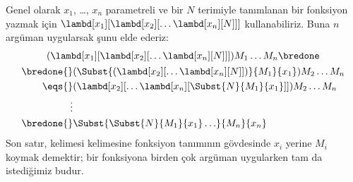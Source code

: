 \documentclass[../../../include/open-logic-section]{subfiles}
\begin{document}
Genel olarak $x_1$, \dots, $x_n$ parametreli ve bir $N$ terimiyle tanımlanan
bir fonksiyon yazmak için
$\lambd[x_1][\lambd[x_2][\ldots\lambd[x_n][N]]]$ kullanabiliriz. Buna $n$
argüman uygularsak şunu elde ederiz:
\begin{multline*}
  (\lambd[x_1][\lambd[x_2][\ldots\lambd[x_n][N]]]) M_1 \dots M_n \bredone\\
  \begin{aligned}
  \bredone {} & (\Subst{(\lambd[x_2][\ldots\lambd[x_n][N]])}{M_1}{x_1}) M_2
  \dots M_n\\
   \eqs {} & (\lambd[x_2][\ldots\lambd[x_n][\Subst{N}{M_1}{x_1}]]) M_2
            \dots M_n \\
  \vdots & \\
  \bredone {} &\Subst{\Subst{N}{M_1}{x_1}\ldots}{M_n}{x_n}
  \end{aligned}
\end{multline*}
Son satır, kelimesi kelimesine fonksiyon tanımının gövdesinde $x_i$ yerine
$M_i$ koymak demektir; bir fonksiyona birden çok argüman uygularken tam da
istediğimiz budur.
\end{document}
